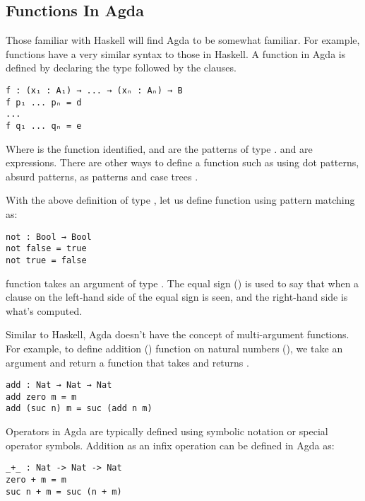 \subsection{Functions In Agda}
Those familiar with Haskell will find Agda to be somewhat familiar. For example,
functions have a very similar syntax to those in Haskell. A function in Agda is
defined by declaring the type followed by the clauses.

\begin{verbatim}
f : (x₁ : A₁) → ... → (xₙ : Aₙ) → B
f p₁ ... pₙ = d
...
f q₁ ... qₙ = e
\end{verbatim} 

Where  is the function identified,  and  are the
patterns of type .  and  are expressions. There
are other ways to define a function such as using dot patterns, absurd patterns,
as patterns and case trees \cite{10.1007/978-3-642-03359-9_6}.

With the above definition of type , let us define  
function using pattern matching as:

\begin{verbatim}
not : Bool → Bool
not false = true
not true = false
\end{verbatim} 

 function takes an argument of type . The equal sign
(\inline{=}) is used to say that when a clause on the left-hand side of the
equal sign is seen, and the right-hand side is what's computed.  

Similar to Haskell, Agda doesn't have the concept of multi-argument functions.
For example, to define addition () function on natural numbers
(), we take an argument  and return a function that
takes  and returns .

\begin{verbatim}
add : Nat → Nat → Nat
add zero m = m
add (suc n) m = suc (add n m)
\end{verbatim}

Operators in Agda are typically defined using symbolic notation or special
operator symbols. Addition as an infix operation can be defined in Agda as:

\label{code:Add}
\begin{verbatim}
_+_ : Nat -> Nat -> Nat
zero + m = m
suc n + m = suc (n + m)
\end{verbatim}

